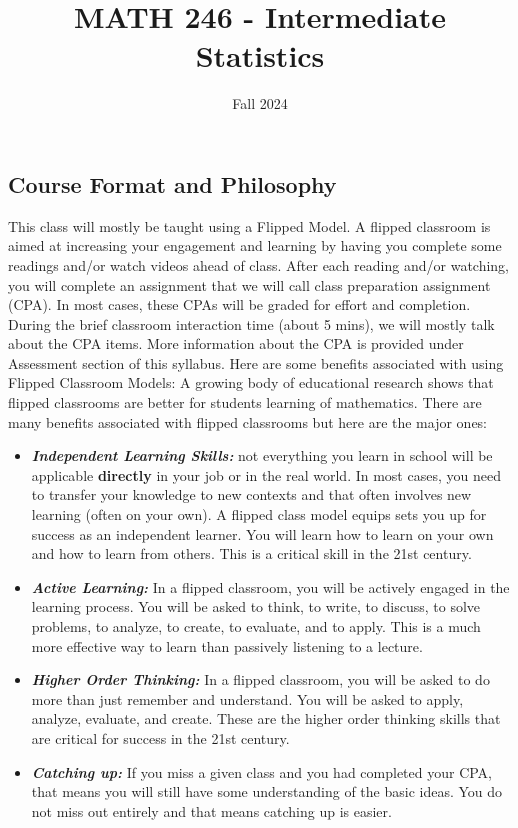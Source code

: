 \documentclass[
  letterpaper,
  DIV=11,
  numbers=noendperiod]{scrartcl}
\title{MATH 246 - Intermediate Statistics}
\subtitle{Fall 2024}
\author{}
\date{}
\begin{document}
\maketitle

\subsection{Course Format and
Philosophy}\label{course-format-and-philosophy}

This class will mostly be taught using a Flipped Model. A flipped
classroom is aimed at increasing your engagement and learning by having
you complete some readings and/or watch videos ahead of class. After
each reading and/or watching, you will complete an assignment that we
will call class preparation assignment (CPA). In most cases, these CPAs
will be graded for effort and completion. During the brief classroom
interaction time (about 5 mins), we will mostly talk about the CPA
items. More information about the CPA is provided under Assessment
section of this syllabus. Here are some benefits associated with using
Flipped Classroom Models: A growing body of educational research shows
that flipped classrooms are better for students learning of mathematics.
There are many benefits associated with flipped classrooms but here are
the major ones:

\begin{itemize}
\item
  \textbf{\emph{Independent Learning Skills:}} not everything you learn
  in school will be applicable \textbf{directly} in your job or in the
  real world. In most cases, you need to transfer your knowledge to new
  contexts and that often involves new learning (often on your own). A
  flipped class model equips sets you up for success as an independent
  learner. You will learn how to learn on your own and how to learn from
  others. This is a critical skill in the 21st century.
\item
  \textbf{\emph{Active Learning:}} In a flipped classroom, you will be
  actively engaged in the learning process. You will be asked to think,
  to write, to discuss, to solve problems, to analyze, to create, to
  evaluate, and to apply. This is a much more effective way to learn
  than passively listening to a lecture.
\item
  \textbf{\emph{Higher Order Thinking:}} In a flipped classroom, you
  will be asked to do more than just remember and understand. You will
  be asked to apply, analyze, evaluate, and create. These are the higher
  order thinking skills that are critical for success in the 21st
  century.
\item
  \textbf{\emph{Catching up:}} If you miss a given class and you had
  completed your CPA, that means you will still have some understanding
  of the basic ideas. You do not miss out entirely and that means
  catching up is easier.
\end{itemize}
\end{document}
